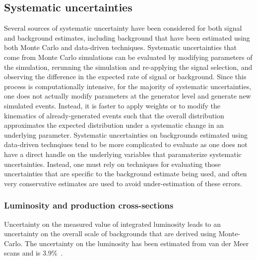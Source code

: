 
\subsection{Systematic uncertainties}\label{sect:syst}
Several sources of systematic uncertainty have been considered for both signal and background estimates,
including background that have been estimated using both Monte Carlo and data-driven techniques.
Systematic uncertainties that come from Monte Carlo simulations can be evaluated by modifying parameters of the simulation,
rerunning the simulation and re-applying the signal selection, and observing the difference in the expected rate of signal or background.
Since this process is computationally intensive, for the majority of systematic uncertainties,
one does not actually modify parameters at the generator level and generate new simulated events.
Instead, it is faster to apply weights or to modify the kinematics of already-generated events
such that the overall distribution approximates the  expected distribution under a systematic change
in an underlying parameter.
Systematic uncertainties on backgrounds estimated using data-driven technqiues tend to be more complicated to evaluate
as one does not have a direct handle on the underlying variables that paramaterize systematic uncertainties.
Instead, one must rely on techniques for evaluating those uncertainties that are specific to the background estimate being used, 
and often very conservative estimates are used to avoid under-estimation of these errors.


\subsubsection{Luminosity and production cross-sections}
Uncertainty on the measured value of integrated luminosity leads to an uncertainty on the overall scale of backgrounds that are derived using Monte-Carlo.
The uncertainty on the luminosity has been estimated from van der Meer scans and is 3.9\%~\cite{Aad:2011dr,ATLAS-CONF-2011-116}. 


